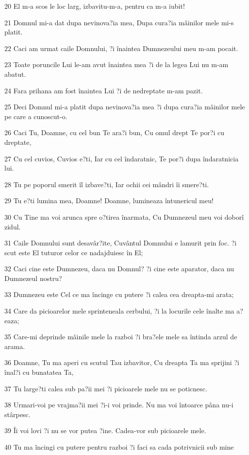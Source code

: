 \par 20 El m-a scos le loc larg, izbavitu-m-a, pentru ca m-a iubit!
\par 21 Domnul mi-a dat dupa nevinova?ia mea, Dupa cura?ia mâinilor mele mi-s platit.
\par 22 Caci am urmat caile Domnului, ?i înaintea Dumnezeului meu m-am pocait.
\par 23 Toate poruncile Lui le-am avut înaintea mea ?i de la legea Lui nu m-am abatut.
\par 24 Fara prihana am fost înaintea Lui ?i de nedreptate m-am pazit.
\par 25 Deci Domnul mi-a platit dupa nevinova?ia mea ?i dupa cura?ia mâinilor mele pe care a cunoscut-o.
\par 26 Caci Tu, Doamne, cu cel bun Te ara?i bun, Cu omul drept Te por?i cu dreptate,
\par 27 Cu cel cuvios, Cuvios e?ti, Iar cu cel îndaratnic, Te por?i dupa îndaratnicia lui.
\par 28 Tu pe poporul smerit îl izbave?ti, Iar ochii cei mândri îi smere?ti.
\par 29 Tu e?ti lumina mea, Doamne! Doamne, lumineaza întunericul meu!
\par 30 Cu Tine ma voi arunca spre o?tirea înarmata, Cu Dumnezeul meu voi doborî zidul.
\par 31 Caile Domnului sunt desavâr?ite, Cuvântul Domnului e lamurit prin foc. ?i scut este El tuturor celor ce nadajduiesc în El;
\par 32 Caci cine este Dumnezeu, daca nu Domnul? ?i cine este aparator, daca nu Dumnezeul nostru?
\par 33 Dumnezeu este Cel ce ma încinge cu putere ?i calea cea dreapta-mi arata;
\par 34 Care da picioarelor mele sprinteneala cerbului, ?i la locurile cele înalte ma a?eaza;
\par 35 Care-mi deprinde mâinile mele la razboi ?i bra?ele mele sa întinda arzul de arama.
\par 36 Doamne, Tu ma aperi cu scutul Tau izbavitor, Cu dreapta Ta ma sprijini ?i înal?i cu bunatatea Ta,
\par 37 Tu large?ti calea sub pa?ii mei ?i picioarele mele nu se poticnesc.
\par 38 Urmari-voi pe vrajma?ii mei ?i-i voi prinde. Nu ma voi întoarce pâna nu-i stârpesc.
\par 39 Îi voi lovi ?i nu se vor putea ?ine. Cadea-vor sub picioarele mele.
\par 40 Tu ma încingi cu putere pentru razboi ?i faci sa cada potrivnicii sub mine
